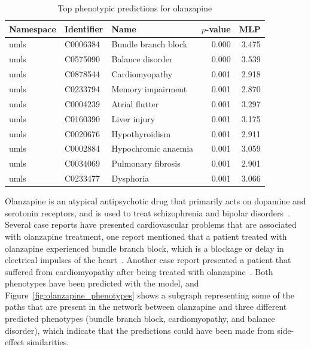 \begin{table}[!ht]
    \centering
    \begin{tabular}{|l|l|l|r|r|}
        \hline
        \textbf{Namespace} & \textbf{Identifier} & \textbf{Name} & \textbf{$p$-value} & \textbf{MLP} \\
        \hline
        umls & C0006384 & Bundle branch block & 0.000 & 3.475 \\
        \hline
        umls & C0575090 & Balance disorder & 0.000 & 3.539 \\
        \hline
        umls & C0878544 & Cardiomyopathy & 0.001 & 2.918 \\
        \hline
        umls & C0233794 & Memory impairment & 0.001 & 2.870 \\
        \hline
        umls & C0004239 & Atrial flutter & 0.001 & 3.297 \\
        \hline
        umls & C0160390 & Liver injury & 0.001 & 3.175 \\
        \hline
        umls & C0020676 & Hypothyroidism & 0.001 & 2.911 \\
        \hline
        umls & C0002884 & Hypochromic anaemia & 0.001 & 3.059 \\
        \hline
        umls & C0034069 & Pulmonary fibrosis & 0.001 & 2.901 \\
        \hline
        umls & C0233477 & Dysphoria & 0.001 & 3.066 \\
        \hline
    \end{tabular}
    \captionsetup{justification=centering}
    \caption{Top phenotypic predictions for olanzapine}
    \label{tab:drug_phenotype}
\end{table}

Olanzapine is an atypical antipsychotic drug that primarily acts on dopamine and serotonin receptors, and is used to treat schizophrenia and bipolar disorders~\cite{thomas_olanzapine_2019}.
Several case reports have presented cardiovascular problems that are associated with olanzapine treatment, one report mentioned that a patient treated with olanzapine experienced bundle branch block, which is a blockage or delay in electrical impulses of the heart~\cite{ninan_case_2017}.
Another case report presented a patient that suffered from cardiomyopathy after being treated with olanzapine~\cite{puttegowda_olanzapine_2016}.
Both phenotypes have been predicted with the model, and Figure~\ref{fig:olanzapine_phenotypes} shows a subgraph representing some of the paths that are present in the network between olanzapine and three different predicted phenotypes (bundle branch block, cardiomyopathy, and balance disorder), which indicate that the predictions could have been made from side-effect similarities.

